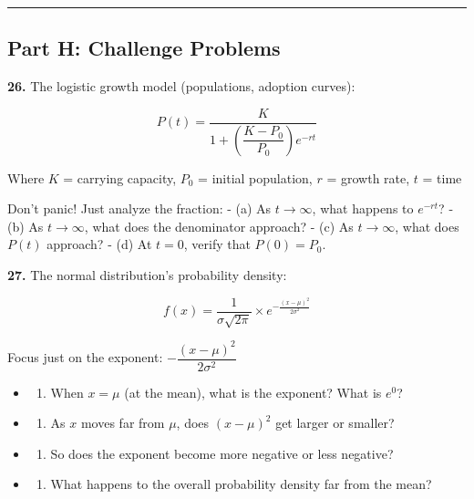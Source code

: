 \documentclass[
  11pt,
]{article}
\providecommand{\tightlist}{%
  \setlength{\itemsep}{0pt}\setlength{\parskip}{0pt}}
\begin{document}
\begin{center}\rule{0.5\linewidth}{0.5pt}\end{center}

\hypertarget{part-h-challenge-problems}{%
\subsection{Part H: Challenge
Problems}\label{part-h-challenge-problems}}

\textbf{26.} The logistic growth model (populations, adoption curves):

\[P(t) = \dfrac{K}{1 + \left(\dfrac{K - P_0}{P_0}\right)e^{-rt}}\]

Where \(K\) = carrying capacity, \(P_0\) = initial population, \(r\) =
growth rate, \(t\) = time

Don't panic! Just analyze the fraction: - (a) As \(t \to \infty\), what
happens to \(e^{-rt}\)? - (b) As \(t \to \infty\), what does the
denominator approach? - (c) As \(t \to \infty\), what does \(P(t)\)
approach? - (d) At \(t = 0\), verify that \(P(0) = P_0\).

\textbf{27.} The normal distribution's probability density:

\[f(x) = \dfrac{1}{\sigma\sqrt{2\pi}} \times e^{-\frac{(x-\mu)^2}{2\sigma^2}}\]

Focus just on the exponent: \(-\dfrac{(x-\mu)^2}{2\sigma^2}\)

\begin{itemize}
\item
  \begin{enumerate}
  \def\labelenumi{(\alph{enumi})}
  \tightlist
  \item
    When \(x = \mu\) (at the mean), what is the exponent? What is
    \(e^0\)?
  \end{enumerate}
\item
  \begin{enumerate}
  \def\labelenumi{(\alph{enumi})}
  \setcounter{enumi}{1}
  \tightlist
  \item
    As \(x\) moves far from \(\mu\), does \((x-\mu)^2\) get larger or
    smaller?
  \end{enumerate}
\item
  \begin{enumerate}
  \def\labelenumi{(\alph{enumi})}
  \setcounter{enumi}{2}
  \tightlist
  \item
    So does the exponent become more negative or less negative?
  \end{enumerate}
\item
  \begin{enumerate}
  \def\labelenumi{(\alph{enumi})}
  \setcounter{enumi}{3}
  \tightlist
  \item
    What happens to the overall probability density far from the mean?
  \end{enumerate}
\end{itemize}
\end{document}
